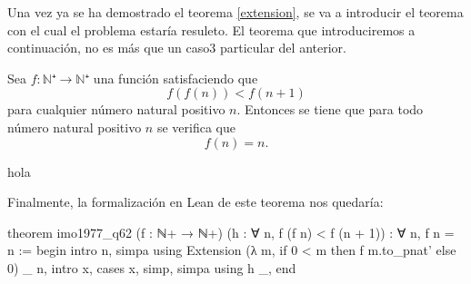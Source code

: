 Una vez ya se ha demostrado el teorema \ref{extension}, se va a
introducir el teorema con el cual el problema estaría resuleto.
El teorema que introduciremos a continuación, no es más que un caso3
particular del anterior.


\begin{teorema}[imo1977\(\_ \)q62]
  Sea \(f:ℕ⁺ → ℕ⁺\) una función satisfaciendo que
  \begin{equation}
    f(f(n))<f(n+1)
  \end{equation}
  para cualquier número natural positivo \(n\). Entonces se tiene
  que para todo número natural positivo \(n\) se verifica que
  \begin{equation}
    f(n)=n.
  \end{equation}
\end{teorema}
\begin{demostracion}
hola
\end{demostracion}

Finalmente, la formalización en Lean de este teorema nos quedaría:
\begin{leancode}
theorem imo1977_q62 (f : ℕ+ → ℕ+) (h : ∀ n, f (f n) < f (n + 1)) :
  ∀ n, f n = n :=
begin
  intro n,
  simpa using Extension (λ m, if 0 < m then f m.to_pnat' else 0) _ n,
  intro x,
  cases x,
  {simp},
  {simpa using h _},
end
\end{leancode}


